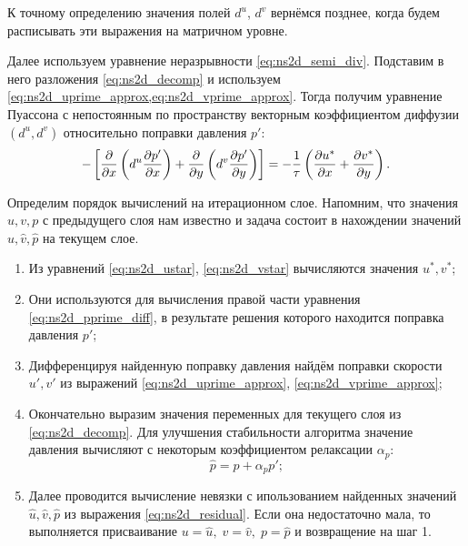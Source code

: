 К точному определению значения полей $d^u$, $d^v$ вернёмся позднее, когда будем расписывать
эти выражения на матричном уровне.

Далее используем уравнение неразрывности \cref{eq:ns2d_semi_div}. Подставим
в него разложения \cref{eq:ns2d_decomp} и используем
\cref{eq:ns2d_uprime_approx,eq:ns2d_vprime_approx}.
Тогда
получим уравнение Пуассона с непостоянным по пространству векторным коэффициентом диффузии $\left(d^u, d^v\right)$
относительно поправки давления $p'$:
\begin{equation}
    \label{eq:ns2d_pprime_diff}
    -\left[
    \frac{\partial }{\partial x}\left(
       d^u \frac{\partial p'}{\partial x} 
            \right)
    +\frac{\partial }{\partial y}\left(
       d^v \frac{\partial p'}{\partial y} 
            \right)
    \right]
    =
    -\frac{1}{\tau}\left(
            \frac{\partial u^*}{\partial x} + \frac{\partial v^*}{\partial y}
    \right).
\end{equation}

Определим порядок вычислений на итерационном слое.
Напомним, что значения $u, v, p$ с
предыдущего слоя нам известно и задача
состоит в нахождении значений $\hat u, \hat v, \hat p$
на текущем слое.

\begin{enumerate}
\item Из уравнений \eqref{eq:ns2d_ustar}, \eqref{eq:ns2d_vstar}
      вычисляются значения $u^*, v^*$;
\item Они используются для вычисления правой части уравнения \eqref{eq:ns2d_pprime_diff},
      в результате решения которого находится поправка давления $p'$;
\item Дифференцируя найденную поправку давления найдём поправки скорости $u', v'$
      из выражений \eqref{eq:ns2d_uprime_approx}, \eqref{eq:ns2d_vprime_approx};
\item Окончательно выразим значения переменных для текущего слоя из \eqref{eq:ns2d_decomp}.
      Для улучшения стабильности алгоритма значение давления вычисляют
      с некоторым коэффициентом релаксации $\alpha_p$:
      \begin{equation*}
           \hat p = p + \alpha_p p';
      \end{equation*}
\item Далее проводится вычисление невязки с ипользованием найденных значений $\hat u, \hat v, \hat p$
      из выражения \eqref{eq:ns2d_residual}. Если она недостаточно мала,
      то выполняется присваивание
      $
           u = \hat u, \; v=\hat v, \; p = \hat p
      $ 
      и возвращение на шаг 1.
\end{enumerate}

